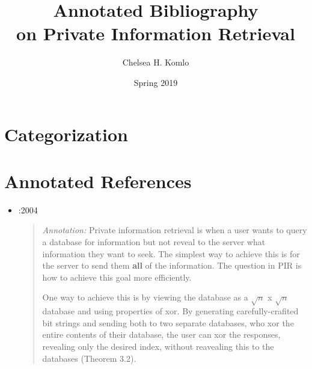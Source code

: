 \documentclass{article}
\title{\textbf{Annotated Bibliography \\ on Private Information Retrieval}}
\author{Chelsea H. Komlo}
\date{Spring 2019}
\newenvironment{annotation}{\begin{quotation}\noindent\textit{Annotation:} }{\end{quotation}}
\begin{document}


\maketitle

\section*{Categorization}

\section*{Annotated References}

\begin{itemize}

\item
	\bibentryGasarch:2004{
	\begin{annotation}
    Private information retrieval is when a user wants to query a database for
    information but not reveal to the server what information they want to
    seek. The simplest way to achieve this is for the server to send them
    \textbf{all} of the information. The question in PIR is how to achieve this
    goal more efficiently.

    One way to achieve this is by viewing the database as a $\sqrt{n}$ x
    $\sqrt{n}$ database and using properties of xor. By generating
    carefully-crafited bit strings and sending both to two separate databases,
    who xor the entire contents of their database, the user can xor the
    responses, revealing only the desired index, without reavealing this to the
    databases (Theorem 3.2).
	\end{annotation}
\end{itemize}
\end{document}
